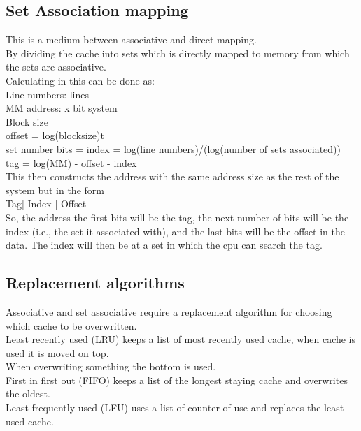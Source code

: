 \documentclass[12pt, a4paper]{article}
\begin{document}
		\subsection{Set Association mapping}
			This is a medium between associative and direct mapping.\\
			By dividing the cache into sets which is directly mapped to memory from which the sets are associative.\\
			Calculating in this can be done as:\\
			Line numbers: lines\\
			MM address: x bit system\\
			Block size\\
			offset = log(blocksize)t \\
			set number bits = index = log(line  numbers)/(log(number of sets associated))\\
			tag  = log(MM) - offset - index\\
			This then constructs the address with the same address size as the rest of the system but in the form\\
			Tag| Index | Offset\\
			So, the address the first bits will be the tag, the next number of bits will be the index (i.e., the set it associated with), and the last bits will be the offset in the data.
			The index will then be at a set in which the cpu can search the tag.
		\subsection{Replacement algorithms}
			Associative and set associative require a replacement algorithm for choosing which cache to be overwritten.\\
			Least recently used (LRU) keeps a list of most recently used cache, when cache is used it is moved on top.\\
			When overwriting something the bottom is used.\\
			First in first out (FIFO) keeps a list of the longest staying cache and overwrites the oldest.\\
			Least frequently used (LFU) uses a list of counter of use and replaces the least used cache.\\
\end{document}
